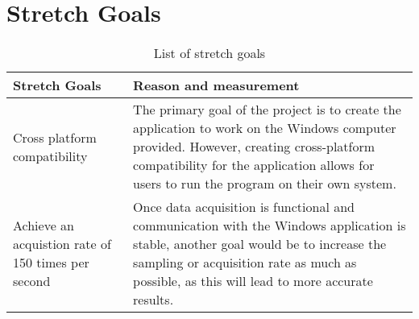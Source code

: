 \documentclass[12pt, titlepage]{article}
\begin{document}
\section{Stretch Goals} %
\begin{table}[h!]
    \centering
    \begin{tabular}{p{} p{}}
    
    \toprule
    \textbf{Stretch Goals} & \textbf{Reason and measurement}\\
   
    \midrule{Cross platform compatibility} & The primary goal of the project is to create the application to work on the Windows computer provided. However, creating cross-platform compatibility for the application allows for users to run the program on their own system. \\
    \midrule{Achieve an acquistion rate of 150 times per second} & Once data acquisition is functional and communication with the Windows application is stable, another goal would be to increase the sampling or acquisition rate as much as possible, as this will lead to more accurate results. \\
    
    \bottomrule
    
    \end{tabular}
    \caption{List of stretch goals}
\end{table}
\end{document}
